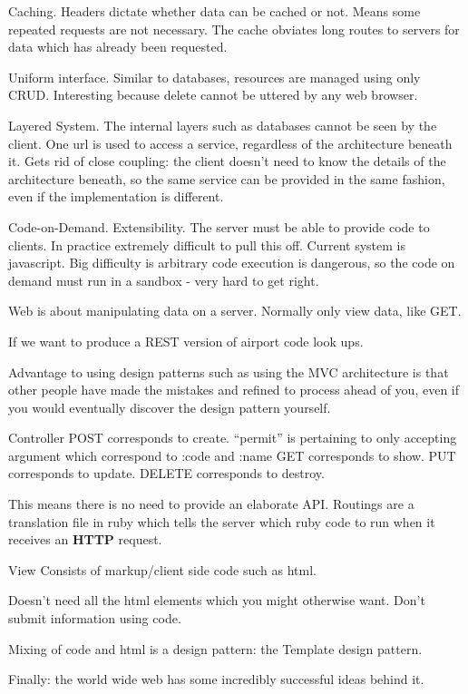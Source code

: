 \documentclass[11pt]{article}
\begin{document}
Caching. Headers dictate whether data can be cached or not. Means some repeated requests are not necessary. The cache obviates long routes to servers for data which has already been requested.

Uniform interface. Similar to databases, resources are managed using only CRUD. Interesting because delete cannot be uttered by any web browser.

Layered System. The internal layers such as databases cannot be seen by the client. One url is used to access a service, regardless of the architecture beneath it. Gets rid of close coupling: the client doesn't need to know the details of the architecture beneath, so the same service can be provided in the same fashion, even if the implementation is different.

Code-on-Demand. Extensibility. The server must be able to provide code to clients. In practice extremely difficult to pull this off. Current system is javascript. Big difficulty is arbitrary code execution is dangerous, so the code on demand must run in a sandbox - very hard to get right.

Web is about manipulating data on a server. Normally only view data, like GET.

If we want to produce a REST version of airport code look ups.

Advantage to using design patterns such as using the MVC architecture is that other people have made the mistakes and refined to process ahead of you, even if you would eventually discover the design pattern yourself.

Controller
POST corresponds to create. ``permit'' is pertaining to only accepting argument which correspond to :code and :name
GET corresponds to show.
PUT corresponds to update.
DELETE corresponds to destroy.

This means there is no need to provide an elaborate API. Routings are a translation file in ruby which tells the server which ruby code to run when it receives an \textbf{HTTP} request.

View
Consists of markup/client side code such as html.

Doesn't need all the html elements which you might otherwise want.
Don't submit information using code.

Mixing of code and html is a design pattern: the Template design pattern.

Finally: the world wide web has some incredibly successful ideas behind it.


\end{document}
